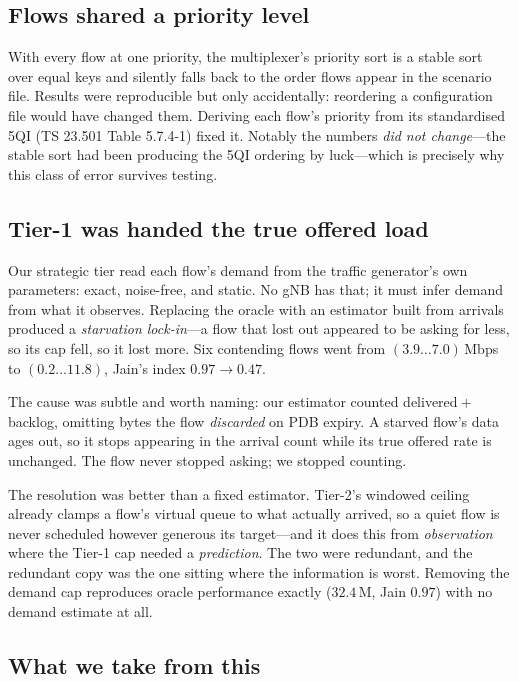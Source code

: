 \documentclass[conference]{IEEEtran}
\begin{document}
\subsection{Flows shared a priority level}

With every flow at one priority, the multiplexer's priority sort is a stable
sort over equal keys and silently falls back to the order flows appear in the
scenario file. Results were reproducible but only accidentally: reordering a
configuration file would have changed them. Deriving each flow's priority
from its standardised 5QI (TS 23.501 Table 5.7.4-1) fixed it. Notably the
numbers \emph{did not change}---the stable sort had been producing the 5QI
ordering by luck---which is precisely why this class of error survives
testing.

\subsection{Tier-1 was handed the true offered load}

Our strategic tier read each flow's demand from the traffic generator's own
parameters: exact, noise-free, and static. No gNB has that; it must infer
demand from what it observes. Replacing the oracle with an estimator built
from arrivals produced a \emph{starvation lock-in}---a flow that lost out
appeared to be asking for less, so its cap fell, so it lost more. Six
contending flows went from $(3.9\ldots7.0)$\,Mbps to $(0.2\ldots11.8)$,
Jain's index $0.97 \to 0.47$.

The cause was subtle and worth naming: our estimator counted
delivered${}+{}$backlog, omitting bytes the flow \emph{discarded} on PDB
expiry. A starved flow's data ages out, so it stops appearing in the
arrival count while its true offered rate is unchanged. The flow never
stopped asking; we stopped counting.

The resolution was better than a fixed estimator. Tier-2's windowed ceiling
already clamps a flow's virtual queue to what actually arrived, so a quiet
flow is never scheduled however generous its target---and it does this from
\emph{observation} where the Tier-1 cap needed a \emph{prediction}. The two
were redundant, and the redundant copy was the one sitting where the
information is worst. Removing the demand cap reproduces oracle performance
exactly ($32.4$\,M, Jain $0.97$) with no demand estimate at all.

\subsection{What we take from this}
\end{document}
